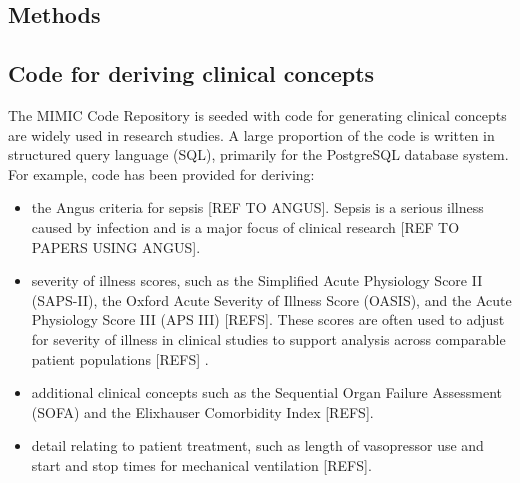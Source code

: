 \documentclass{bioinfo}
\begin{document}

\begin{methods}
\section{Methods}

\subsection{Code for deriving clinical concepts}

The MIMIC Code Repository is seeded with code for generating clinical concepts are widely used in research studies. A large proportion of the code is written in structured query language (SQL), primarily for the PostgreSQL database system. For example, code has been provided for deriving:

\begin{itemize}
\item the Angus criteria for sepsis [REF TO ANGUS]. Sepsis is a serious illness caused by infection and is a major focus of clinical research [REF TO PAPERS USING ANGUS].
\item severity of illness scores, such as the Simplified Acute Physiology Score II (SAPS-II), the Oxford Acute Severity of Illness Score (OASIS), and the Acute Physiology Score III (APS III) [REFS]. These scores are often used to adjust for severity of illness in clinical studies to support analysis across comparable patient populations [REFS] .
\item additional clinical concepts such as the Sequential Organ Failure Assessment (SOFA) and the Elixhauser Comorbidity Index [REFS].
\item detail relating to patient treatment, such as length of vasopressor use and start and stop times for mechanical ventilation [REFS].
\end{itemize}





\end{methods}
\end{document}
